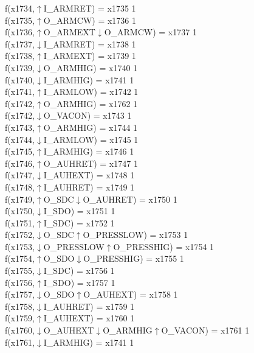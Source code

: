 f(x1734,$\uparrow$I\_ARMRET) = x1735 {1} \\
f(x1735,$\uparrow$O\_ARMCW) = x1736 {1} \\
f(x1736,$\uparrow$O\_ARMEXT$\downarrow$O\_ARMCW) = x1737 {1} \\
f(x1737,$\downarrow$I\_ARMRET) = x1738 {1} \\
f(x1738,$\uparrow$I\_ARMEXT) = x1739 {1} \\
f(x1739,$\downarrow$O\_ARMHIG) = x1740 {1} \\
f(x1740,$\downarrow$I\_ARMHIG) = x1741 {1} \\
f(x1741,$\uparrow$I\_ARMLOW) = x1742 {1} \\
f(x1742,$\uparrow$O\_ARMHIG) = x1762 {1} \\
f(x1742,$\downarrow$O\_VACON) = x1743 {1} \\
f(x1743,$\uparrow$O\_ARMHIG) = x1744 {1} \\
f(x1744,$\downarrow$I\_ARMLOW) = x1745 {1} \\
f(x1745,$\uparrow$I\_ARMHIG) = x1746 {1} \\
f(x1746,$\uparrow$O\_AUHRET) = x1747 {1} \\
f(x1747,$\downarrow$I\_AUHEXT) = x1748 {1} \\
f(x1748,$\uparrow$I\_AUHRET) = x1749 {1} \\
f(x1749,$\uparrow$O\_SDC$\downarrow$O\_AUHRET) = x1750 {1} \\
f(x1750,$\downarrow$I\_SDO) = x1751 {1} \\
f(x1751,$\uparrow$I\_SDC) = x1752 {1} \\
f(x1752,$\downarrow$O\_SDC$\uparrow$O\_PRESSLOW) = x1753 {1} \\
f(x1753,$\downarrow$O\_PRESSLOW$\uparrow$O\_PRESSHIG) = x1754 {1} \\
f(x1754,$\uparrow$O\_SDO$\downarrow$O\_PRESSHIG) = x1755 {1} \\
f(x1755,$\downarrow$I\_SDC) = x1756 {1} \\
f(x1756,$\uparrow$I\_SDO) = x1757 {1} \\
f(x1757,$\downarrow$O\_SDO$\uparrow$O\_AUHEXT) = x1758 {1} \\
f(x1758,$\downarrow$I\_AUHRET) = x1759 {1} \\
f(x1759,$\uparrow$I\_AUHEXT) = x1760 {1} \\
f(x1760,$\downarrow$O\_AUHEXT$\downarrow$O\_ARMHIG$\uparrow$O\_VACON) = x1761 {1} \\
f(x1761,$\downarrow$I\_ARMHIG) = x1741 {1} \\
